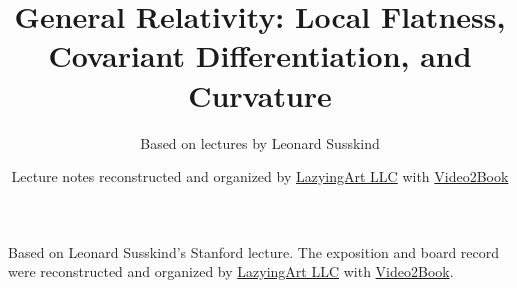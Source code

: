 \documentclass[11pt,oneside]{book}
\begin{document}
\frontmatter
\title{General Relativity: Local Flatness, Covariant Differentiation, and Curvature}
\author{Based on lectures by Leonard Susskind}
\date{Lecture notes reconstructed and organized by \href{https://lazying.art}{LazyingArt LLC} with \href{https://github.com/lachlanchen/Video2Book}{Video2Book}}
\maketitle
\begin{center}
\small Based on Leonard Susskind's Stanford lecture. The exposition and board record were reconstructed and organized by \href{https://lazying.art}{LazyingArt LLC} with \href{https://github.com/lachlanchen/Video2Book}{Video2Book}.
\end{center}
\clearpage
\mainmatter

\end{document}
